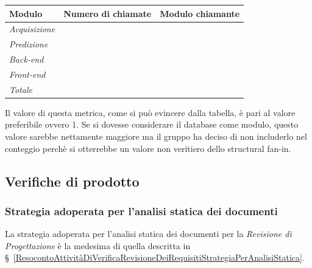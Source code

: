 {{{{{{{\quad
\def\tabularxcolumn#1{m{#1}}
{
	\begin{center}
		\renewcommand{\arraystretch}{1.4}
		\begin{longtable}[c]{|p{3cm}|p{5cm}|p{5cm}|}
			\hline
			\rowcolor{airforceblue}
			\textbf{Modulo} & \textbf{Numero di chiamate} & \textbf{Modulo chiamante}\\
			\hline
			\textit{Acquisizione} & \makecell[c]{0} & \makecell[c]{-}\\
			\hline
			\textit{Predizione} & \makecell[c]{0} & \makecell[c]{-}\\
			\hline
			\textit{Back-end} &  \makecell[c]{1} & \makecell[c]{Front end}\\
			\hline
			\textit{Front-end} &  \makecell[c]{0} & \makecell[c]{-}\\
			\hline
			\textit{Totale} & \makecell[c]{1} & \makecell[c]{Front end}\\
			\hline
		\end{longtable}
	\end{center}

Il valore di questa metrica, come si può evincere dalla tabella, è pari al valore preferibile ovvero 1. Se si dovesse considerare il database come modulo, questo valore sarebbe nettamente maggiore ma il gruppo ha deciso di non includerlo nel conteggio perchè si otterrebbe un valore non veritiero dello structural fan-in.

\subsection{Verifiche di prodotto}\label{ResocontoAttivitàDiVerificaRevisioneDiQualificaVerificheDiProdotto}

\subsubsection{Strategia adoperata per l'analisi statica dei documenti}\label{ResocontoAttivitàDiVerificaRevisioneDiQualificaVerificheDiProdottoStrategiaAdoperataPerLAnalisiStaticaDeiDocumenti}
La strategia adoperata per l’analisi statica dei documenti per la \textit{Revisione di Progettazione} è la medesima di quella descritta in \S~\ref{ResocontoAttivitàDiVerificaRevisioneDeiRequisitiStrategiaPerAnalisiStatica}.

}}}}}}}}

